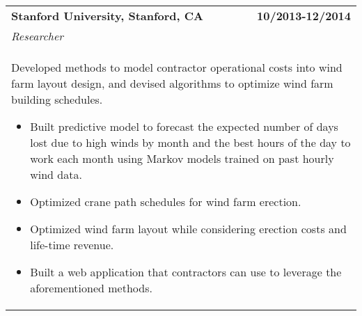 \documentclass[a4paper,10pt]{article}
\begin{document}
\begin{tabularx}{\textwidth}{Xr}
\bf{Stanford University}, Stanford, CA & \bf{10/2013-12/2014}\\
\emph{Researcher} &\\
\multicolumn{2}{p{0.98\textwidth}}{
Developed methods to model contractor operational costs into wind farm layout design, and devised algorithms to optimize wind farm building schedules.
\begin{itemize} 
	\item Built predictive model to forecast the expected number of days lost due to high winds by month and the best hours of the day to work each month using Markov models trained on past hourly wind data. 
	\item Optimized crane path schedules for wind farm erection. 
	\item Optimized wind farm layout while considering erection costs and life-time revenue.
	\item Built a web application that contractors can use to leverage the aforementioned methods.
\end{itemize}
}\\





\end{tabularx}
\end{document}
